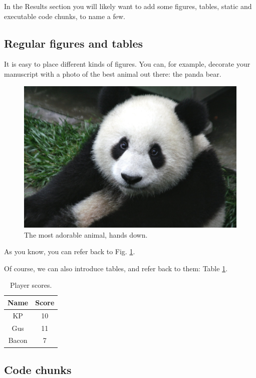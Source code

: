\documentclass[12pt]{article}
\begin{document}
In the Results section you will likely want to add some figures,
tables, static and executable code chunks, to name a few.

\subsection*{Regular figures and tables}

It is easy to place different kinds of figures.
You can, for example, decorate your manuscript with a photo of the
best animal out there: the panda bear.

\begin{figure}
  \centering
  \includegraphics[width=12cm]{figs/pandacub.jpeg}
  \caption{The most adorable animal, hands down.}
  \label{fig:panda}
\end{figure}  

As you know, you can refer back to Fig. \ref{fig:panda}.

Of course, we can also introduce tables, and refer back to them: Table
\ref{tab:playerscores}.

\begin{table}[h!]
  \centering
  \begin{tabular}{ c c }
    \hline
    Name & Score\\
    \hline
    KP & 10\\
    Gus & 11\\
    Bacon & 7\\
    \hline
  \end{tabular}
  \caption{Player scores.}
  \label{tab:playerscores}
\end{table}

\subsection*{Code chunks}
\end{document}
